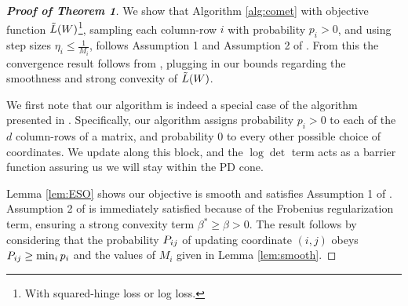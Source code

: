 \documentclass{article}
\begin{document}
\begin{proof}[\bf{Proof of Theorem 1}]
We show that Algorithm \ref{alg:comet} with objective function $\tilde{L}({W})$\footnote{With squared-hinge loss or log loss.}, sampling each column-row $i$ with probability $p_i >0$, and using step sizes $\eta_i \leq \frac{1}{M_i}$, follows Assumption 1 and Assumption 2 of \citet{richtarik2013optimal}. From this the convergence result follows from \citeauthor[Theorem 3]{richtarik2013optimal}, plugging in our bounds regarding the smoothness and strong convexity of $\tilde{L}({W})$.

We first note that our algorithm is indeed a special case of the algorithm presented in \citet{richtarik2013optimal}. Specifically, our algorithm assigns probability $p_i > 0 $ to each of the $d$ column-rows of a matrix, and probability $0$ to every other possible choice of coordinates. We update along this block, and the $\log \det$ term acts as a barrier function
assuring us we will stay within the PD cone.

Lemma \ref{lem:ESO} shows our objective is smooth and satisfies Assumption 1 of \citeauthor{richtarik2013optimal}. Assumption 2 of \citeauthor{richtarik2013optimal} is immediately satisfied because of the Frobenius regularization term, ensuring a strong convexity term $\beta^* \geq \beta > 0$. The result follows by considering that the probability ${P}_{ij}$ of updating coordinate $(i,j)$ obeys ${P}_{ij} \geq \min_i p_i $ and the values of $M_i$ given in Lemma \ref{lem:smooth}.

\end{proof}

\newpage


\end{document}
